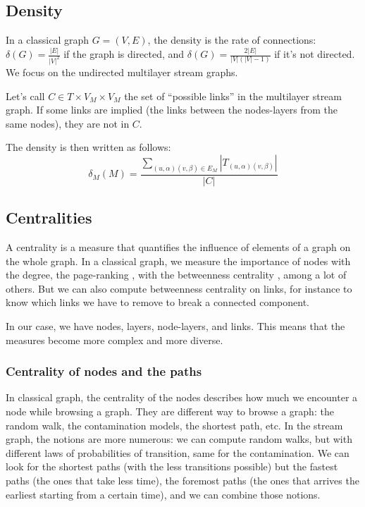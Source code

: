 \documentclass{svproc}
\begin{document}
\subsection{Density}
%
In a classical graph $G=(V,E)$, the density is the rate of connections: $\delta(G)= \frac{|E|}{|V|^2}$ if the graph is directed, and  $\delta(G)= \frac{2|E|}{|V|(|V|-1)}$ if it's not directed. We focus on the undirected multilayer stream graphs.

\begin{definition}	Let's call $C \in T \times V_M\times V_M$ the set of ``possible links'' in the multilayer stream graph. If some links are implied (the links between the nodes-layers from the same nodes), they are not in $C$.

	The density is then written as follows:
	\[
		\delta_M (M)
		= \frac{\sum_{(u,\alpha)(v,\beta) \in E_M}|T_{(u,\alpha)(v,\beta)}|}{|C|}
	\]
\end{definition}



\subsection{Centralities}
%
A centrality is a measure that quantifies the influence of elements of a graph on the whole graph. In a classical graph, we measure the importance of nodes with the degree, the page-ranking \cite{pr}, with the betweenness centrality \cite{btw}, among a lot of others. But we can also compute betweenness centrality on links, for instance to know which links we have to remove to break a connected component.

In our case, we have nodes, layers, node-layers, and links. This means that the measures become more complex and more diverse.

%
\subsubsection{Centrality of nodes and the paths}
%
In classical graph, the centrality of the nodes describes how much we encounter a node while browsing a graph. They are different way to browse a graph: the random walk, the contamination models, the shortest path, etc. In the stream graph, the notions are more numerous: we can compute random walks, but with different laws of probabilities of transition, same for the contamination. We can look for the shortest paths (with the less transitions possible) but the fastest paths (the ones that take less time), the foremost paths (the ones that arrives the earliest starting from a certain time), and we can combine those notions.
\end{document}
